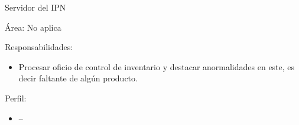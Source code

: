 \begin{Actor}{Servidor del IPN}{}
	\item[Área:] No aplica
	\item[Responsabilidades:] \hspace{1pt}
	\begin{itemize}
		\item Procesar oficio de control de inventario y destacar anormalidades en este, es decir faltante de algún producto.
	\end{itemize}
	\item[Perfil:] \hspace{1pt}
	\begin{itemize}
		\item --
	\end{itemize}
\end{Actor}

